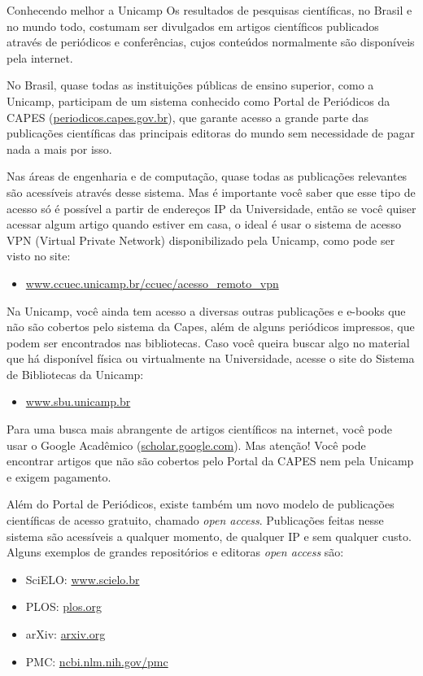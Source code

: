 \begin{story}{Conhecendo melhor a Unicamp}
Os resultados de pesquisas científicas, no Brasil e no mundo todo, costumam ser divulgados em artigos científicos publicados através de periódicos e conferências, cujos conteúdos normalmente são disponíveis pela internet.

No Brasil, quase todas as instituições públicas de ensino superior, como a Unicamp, participam de um sistema conhecido como Portal de Periódicos da CAPES (\url{periodicos.capes.gov.br}), que garante acesso a grande parte das publicações científicas das principais editoras do mundo sem necessidade de pagar nada a mais por isso.

Nas áreas de engenharia e de computação, quase todas as publicações relevantes são acessíveis através desse sistema. Mas é importante você saber que esse tipo de acesso só é possível a partir de
endereços IP da Universidade, então se você quiser acessar algum artigo quando estiver em casa, o ideal é usar o sistema de acesso VPN (Virtual Private Network) disponibilizado pela Unicamp, como pode ser visto no site:

\begin{itemize}
\item \url{www.ccuec.unicamp.br/ccuec/acesso_remoto_vpn}
\end{itemize}

Na Unicamp, você ainda tem acesso a diversas outras publicações e e-books que não são cobertos pelo sistema da Capes, além de alguns periódicos impressos, que podem ser encontrados nas bibliotecas. Caso você queira buscar algo no material que há disponível física ou virtualmente na Universidade, acesse o site do Sistema de Bibliotecas da Unicamp:

\begin{itemize}
\item \url{www.sbu.unicamp.br}
\end{itemize}

Para uma busca mais abrangente de artigos científicos na internet, você pode usar o Google Acadêmico (\url{scholar.google.com}). Mas atenção! Você pode encontrar artigos que não são cobertos pelo Portal da CAPES nem pela Unicamp e exigem pagamento.

Além do Portal de Periódicos, existe também um novo modelo de publicações científicas de acesso gratuito, chamado \emph{open access}. Publicações feitas nesse sistema são acessíveis a qualquer momento, de qualquer IP e sem qualquer custo. Alguns exemplos de grandes repositórios e editoras \emph{open access} são:

\begin{itemize}
\item SciELO: \url{www.scielo.br}
\item PLOS: \url{plos.org}
\item arXiv: \url{arxiv.org}
\item PMC: \url{ncbi.nlm.nih.gov/pmc}
\end{itemize}


\end{story}
